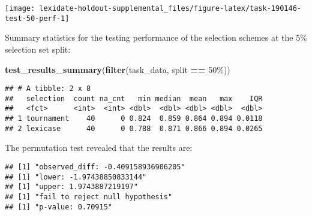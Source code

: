\documentclass[
]{book}
\newenvironment{Shaded}{\begin{snugshade}}{\end{snugshade}}
\newcommand{\AttributeTok}[1]{\textcolor[rgb]{0.13,0.29,0.53}{#1}}
\newcommand{\DecValTok}[1]{\textcolor[rgb]{0.00,0.00,0.81}{#1}}
\newcommand{\FunctionTok}[1]{\textcolor[rgb]{0.13,0.29,0.53}{\textbf{#1}}}
\newcommand{\NormalTok}[1]{#1}
\newcommand{\OtherTok}[1]{\textcolor[rgb]{0.56,0.35,0.01}{#1}}
\newcommand{\SpecialCharTok}[1]{\textcolor[rgb]{0.81,0.36,0.00}{\textbf{#1}}}
\newcommand{\StringTok}[1]{\textcolor[rgb]{0.31,0.60,0.02}{#1}}
\begin{document}
\texttt{[image: lexidate-holdout-supplemental\_files/figure-latex/task-190146-test-50-perf-1]}

Summary statistics for the testing performance of the selection schemes at the 5\% selection set split:

\begin{Shaded}
\begin{Highlighting}[]
\FunctionTok{test\_results\_summary}\NormalTok{(}\FunctionTok{filter}\NormalTok{(task\_data, split }\SpecialCharTok{==} \StringTok{\textquotesingle{}50\%\textquotesingle{}}\NormalTok{))}
\end{Highlighting}
\end{Shaded}

\begin{verbatim}
## # A tibble: 2 x 8
##   selection  count na_cnt   min median  mean   max    IQR
##   <fct>      <int>  <int> <dbl>  <dbl> <dbl> <dbl>  <dbl>
## 1 tournament    40      0 0.824  0.859 0.864 0.894 0.0118
## 2 lexicase      40      0 0.788  0.871 0.866 0.894 0.0265
\end{verbatim}

The permutation test revealed that the results are:

\begin{Shaded}
\end{Shaded}

\begin{verbatim}
## [1] "observed_diff: -0.409158936906205"
## [1] "lower: -1.97438850833144"
## [1] "upper: 1.9743887219197"
## [1] "fail to reject null hypothesis"
## [1] "p-value: 0.70915"
\end{verbatim}
\end{document}
